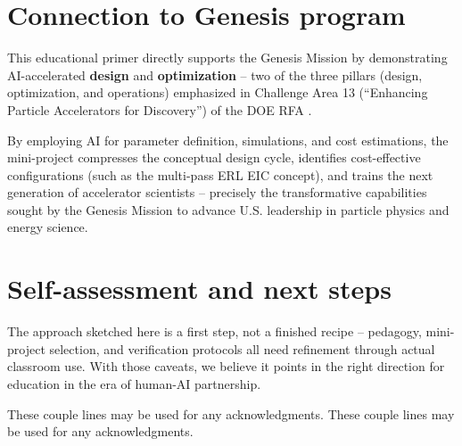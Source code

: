 \documentclass[%
               refpage,       %
               biblatex,     %
               hyphens,      %
               ]{jacow}
\begin{document}
\section{Connection to Genesis program}

This educational primer directly supports the Genesis Mission by demonstrating AI-accelerated  \textbf{design} and \textbf{optimization} -- two of the three pillars (design, optimization, and operations) emphasized in Challenge Area 13 (``Enhancing Particle Accelerators for Discovery'') of the DOE RFA \cite{Genesis-RFA}. 

By employing AI for parameter definition,  simulations, and cost estimations, the mini-project compresses the conceptual design cycle, identifies cost-effective configurations (such as the multi-pass ERL EIC concept), and trains the next generation of accelerator scientists -- precisely the transformative capabilities sought by the Genesis Mission to advance U.S. leadership in particle physics and energy science.

\section{Self-assessment and next steps}

The approach sketched here is a first step, not a finished recipe -- pedagogy, mini-project selection, and verification protocols all need refinement through actual classroom use. With those caveats, we believe it points in the right direction for education in the era of human-AI partnership.

These couple lines may be used for any acknowledgments. These couple lines may be used for any acknowledgments. 

 




\printbibliography
\end{document}
